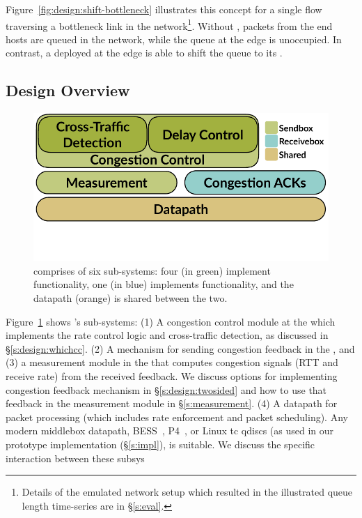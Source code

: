 Figure~\ref{fig:design:shift-bottleneck} illustrates this concept for a single flow traversing a bottleneck link in the 
network\footnote{Details of the emulated network setup which resulted in the illustrated queue length time-series are in \S\ref{s:eval}.}.
Without \name, packets from the end hosts are queued in the network, while the queue at the edge is unoccupied. 
In contrast, a \name deployed at the edge is able to shift the queue to its \inbox.

\subsection{Design Overview}\label{s:design:overview}
\begin{figure}
    \centering
    \includegraphics[width=\columnwidth]{img/arch-block-diag}
    \vspace{-40pt}
    \caption{\name comprises of six sub-systems: four (in green) implement \inbox functionality, one (in blue) implements \outbox functionality, and the datapath (orange) is shared between the two.}\label{fig:design:block-diag}
\end{figure}

Figure~\ref{fig:design:block-diag} shows \name's sub-systems: 
(1) A congestion control module at the \inbox which implements the rate control logic and cross-traffic detection, as discussed in \S\ref{s:design:whichcc}.
(2) A mechanism for sending congestion feedback in the \outbox, and (3) a measurement module in the \inbox that computes congestion signals (RTT and receive rate) from the received feedback. We discuss options for implementing congestion feedback mechanism in \S\ref{s:design:twosided} and how to use that feedback in the measurement module in \S\ref{s:measurement}.
(4) A datapath for packet processing (which includes rate enforcement and packet scheduling). Any modern middlebox datapath, \eg BESS~\cite{bess}, P4~\cite{p4}, or  Linux tc qdiscs (as used in our prototype implementation (\S\ref{s:impl}), is suitable.
We discuss the specific interaction between these subsys

